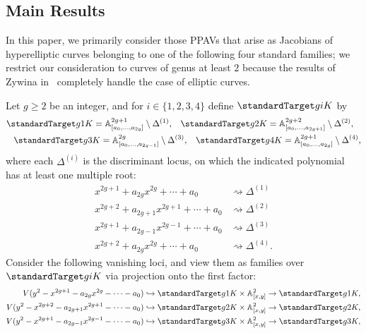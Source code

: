 \subsection{Main Results}

In this paper, we primarily consider those PPAVs that arise as Jacobians of hyperelliptic curves belonging to one of the following four standard families; we restrict our consideration to curves of genus at least $2$ because the results of Zywina in~\cite{zywina2010hilbert} completely handle the case of elliptic curves.
\begin{definition}
	\label{definition:standard-families}
Let $g \geq 2$ be an integer, and for $i \in \{1, 2, 3, 4 \}$ define $\standardTarget g i K$ by
\begin{align*}
&\standardTarget g 1 K = \mathbb A^{2g+1}_{[a_0, \ldots, a_{2g}]} \setminus \Delta^{(1)}, \,\,\,\,\, \standardTarget g 2 K = \mathbb A^{2g+2}_{[a_0, \ldots, a_{2g+1}]}\setminus \Delta^{(2)}, \\
&\,\,\,\,\,  \standardTarget g 3 K = \mathbb A^{2g}_{[a_0, \ldots, a_{2g-1}]}\setminus \Delta^{(3)}, \,\,\,\,\,  \standardTarget g 4 K = \mathbb A^{2g+1}_{[a_0, \ldots, a_{2g}]} \setminus \Delta^{(4)}, 
\end{align*}
where each $\Delta^{(i)}$ is the discriminant locus, on which the indicated polynomial has at least one multiple root: 
\[
\begin{array}{cc}
x^{2g+1} + a_{2g}x^{2g} + \cdots + a_0  &\rightsquigarrow  \Delta^{(1)}  \\
x^{2g+2} + a_{2g+1}x^{2g+1} + \cdots + a_0 & \rightsquigarrow  \Delta^{(2)}\\
x^{2g+1} + a_{2g-1}x^{2g-1} + \cdots + a_0  &\rightsquigarrow \Delta^{(3)}\\
x^{2g+2} + a_{2g}x^{2g} + \cdots + a_0 &\rightsquigarrow \Delta^{(4)}.
\end{array}
\]
Consider the following vanishing loci, and view them as families over $\standardTarget g i K$ via projection onto the first factor:
\begin{align*}
V(y^2 - x^{2g+1} - a_{2g}x^{2g} - \cdots - a_0) &\hookrightarrow \standardTarget g 1 K \times \mathbb A^2_{[x,y]} \to \standardTarget g 1 K, \\
V(y^2 - x^{2g+2} - a_{2g+1}x^{2g+1} - \cdots - a_0) &\hookrightarrow \standardTarget g 2 K \times \mathbb A^2_{[x,y]} \to \standardTarget g 2 K,  \\
V(y^2 - x^{2g+1} - a_{2g-1}x^{2g-1} - \cdots - a_0) &\hookrightarrow \standardTarget g 3 K\times \mathbb A^2_{[x,y]} \to  \standardTarget g 3 K, \\

\end{align*}
\end{definition}
